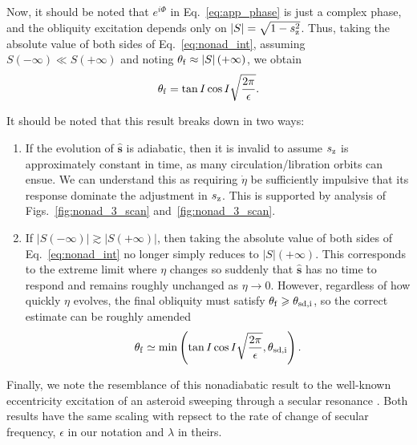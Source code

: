 \documentclass[
        fleqn,
        usenatbib,
    ]{mnras}
\newcommand*{\abs}[1]{\left|#1\right|}
\newcommand*{\bm}[1]{\boldsymbol{\mathbf{#1}}}
\newcommand*{\uv}[1]{\hat{\bm{#1}}}
\newcommand*{\p}[1]{\left(#1\right)}
\begin{document}
Now, it should be noted that $e^{i\Phi}$ in Eq.~\ref{eq:app_phase} is just a
complex phase, and the obliquity excitation depends only on $\abs{S} = \sqrt{1 -
s_{\rm z}^2}$. Thus, taking the absolute value of both sides of
Eq.~\eqref{eq:nonad_int}, assuming $S\p{-\infty} \ll S\p{+\infty}$ and noting
$\theta_{\rm f} \approx \abs{S}(+\infty)$, we obtain
\begin{equation}
    \theta_{\rm f} = \tan I\cos I\sqrt{\frac{2\pi}{\epsilon}}.
        \label{eq:nonad_dong}
\end{equation}

It should be noted that this result breaks down in two ways:
\begin{enumerate}
    \item If the evolution of $\uv{s}$ is adiabatic, then it is invalid to
        assume $s_{\rm z}$ is approximately constant in time, as many
        circulation/libration orbits can ensue. We can understand this as
        requiring $\dot{\eta}$ be sufficiently impulsive that its response
        dominate the adjustment in $s_{\rm z}$. This is supported by analysis of
        Figs.~\ref{fig:nonad_3_scan} and~\ref{fig:nonad_3_scan}.

    \item If $\abs{S\p{-\infty}} \gtrsim \abs{S\p{+\infty}}$, then taking the
        absolute value of both sides of Eq.~\eqref{eq:nonad_int} no longer
        simply reduces to $\abs{S}\p{+\infty}$. This corresponds to the extreme
        limit where $\eta$ changes so suddenly that $\uv{s}$ has no time to
        respond and remains roughly unchanged as $\eta \to 0$. However,
        regardless of how quickly $\eta$ evolves, the final obliquity must
        satisfy $\theta_{\rm f} \geq \theta_{\rm sd, i}$, so the correct
        estimate can be roughly amended
        \begin{equation}
            \theta_{\rm f} \simeq \min\p{\tan I\cos
                I\sqrt{\frac{2\pi}{\epsilon}}, \theta_{\rm sd, i}}.
        \end{equation}
\end{enumerate}

Finally, we note the resemblance of this nonadiabatic result to the well-known
eccentricity excitation of an asteroid sweeping through a secular resonance
\citep{malhotra_calc}. Both results have the same scaling with repsect to the
rate of change of secular frequency, $\epsilon$ in our notation and $\lambda$ in
theirs.

\bsp
\label{lastpage} %
\end{document}
